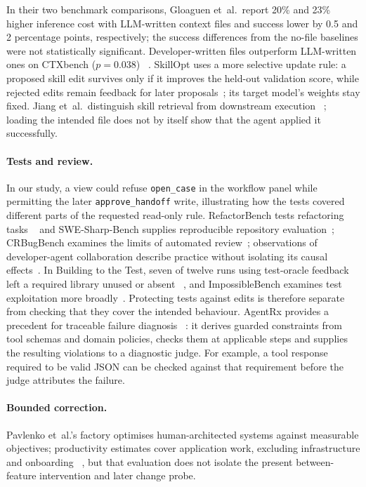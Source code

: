 In their two benchmark comparisons, Gloaguen et~al.\ report 20\% and 23\%
higher inference cost with LLM-written context files and success lower by
0.5 and 2 percentage points, respectively; the success differences from
the no-file baselines were not statistically significant. Developer-written files outperform
LLM-written ones on CTXbench ($p=0.038$)
~\cite[Sec.~4.2, Tables~2--3]{gloaguen2026agentsmd}.
SkillOpt uses a more selective update rule: a proposed skill edit survives
only if it improves the held-out validation score, while rejected edits
remain feedback for later proposals~\cite[How SkillOpt works]{microsoft2026skillopt};
its target model's weights stay fixed.
Jiang et~al.\ distinguish skill retrieval from downstream execution
~\cite{jiang2026skills}; loading the intended file does not by itself
show that the agent applied it successfully.

\paragraph{Tests and review.}\label{sec:evaluationwork}
In our study, a view could refuse \texttt{open\_case} in the workflow panel while permitting the later \texttt{approve\_handoff} write, illustrating how the tests covered different parts of the requested read-only rule.
RefactorBench tests refactoring tasks ~\cite{gautam2025refactorbench} and SWE-Sharp-Bench supplies reproducible repository evaluation~\cite{mhatre2025swesharp}; CRBugBench examines the
limits of automated review~\cite{yang2026crbugbench}; observations of
developer-agent collaboration describe practice without isolating its
causal effects~\cite{kumar2025agents}. In Building to the Test, seven of
twelve runs using test-oracle feedback left a required library unused or absent
~\cite{ma2026building}, and ImpossibleBench examines test exploitation more
broadly~\cite{zhong2026impossiblebench}. Protecting tests against edits is
therefore separate from checking that they cover the intended behaviour.
AgentRx provides a precedent for traceable failure diagnosis
~\cite{microsoft2026agentrx}: it derives guarded constraints from tool
schemas and domain policies, checks them at applicable steps and supplies
the resulting violations to a diagnostic judge. For example, a tool
response required to be valid JSON can be checked against that requirement
before the judge attributes the failure.

\paragraph{Bounded correction.}\label{sec:factory}
Pavlenko et~al.'s factory optimises human-architected systems against
measurable objectives; productivity estimates cover application work,
excluding infrastructure and onboarding
~\cite{pavlenko2026factory}, but that evaluation does not isolate the present
between-feature intervention and later change probe.

